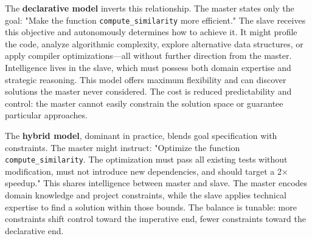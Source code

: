 The \textbf{declarative model} inverts this relationship. The master states only the goal: "Make the function \texttt{compute\_similarity} more efficient." The slave receives this objective and autonomously determines how to achieve it. It might profile the code, analyze algorithmic complexity, explore alternative data structures, or apply compiler optimizations—all without further direction from the master. Intelligence lives in the slave, which must possess both domain expertise and strategic reasoning. This model offers maximum flexibility and can discover solutions the master never considered. The cost is reduced predictability and control: the master cannot easily constrain the solution space or guarantee particular approaches.

The \textbf{hybrid model}, dominant in practice, blends goal specification with constraints. The master might instruct: "Optimize the function \texttt{compute\_similarity}. The optimization must pass all existing tests without modification, must not introduce new dependencies, and should target a 2× speedup." This shares intelligence between master and slave. The master encodes domain knowledge and project constraints, while the slave applies technical expertise to find a solution within those bounds. The balance is tunable: more constraints shift control toward the imperative end, fewer constraints toward the declarative end.

